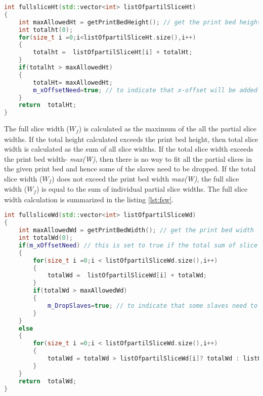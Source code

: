 \begin{lstlisting}[language=C++,label={lst:fsh},caption={Calculate full slice height}]
int fullsliceHt(std::vector<int> listOfpartilSliceHt)
{
	int maxAllowedHt = getPrintBedHeight(); // get the print bed height
	int totalht(0);
	for(size_t i =0;i<listOfpartilSliceHt.size(),i++)
	{
		totalht =  listOfpartilSliceHt[i] + totalHt;
	}
	if(totalht > maxAllowedHt)
	{
		totalHt= maxAllowedHt; 
		m_xOffsetNeed=true; // to indicate that x-offset will be added to some slaves
	}
	return 	totalHt;
}

\end{lstlisting}

The full slice width (\begin{math}W_{\textit{f}}\end{math}) is calculated as the maximum of the all the partial slice widths. If the total height calculated exceeds the print bed height, then total slice width is calculated as the sum of all slice widths. If the total slice width exceeds the print bed width- \textit{max(W)}, then there is no way to fit all the partial slices in the given print bed and hence some of the slaves need to be dropped. If the total slice width (\begin{math}W_{\textit{f}}\end{math}) does not exceed the print bed width \textit{max(W)}, the full slice width (\begin{math}W_{\textit{f}}\end{math}) is equal to the sum of individual partial slice widths. The full slice width calculation is summarized in the listing \ref{lst:fsw}.\newline     


\begin{lstlisting}[language=C++,label={lst:fsw},caption={Calculate full slice width}]
int fullsliceWd(std::vector<int> listOfpartilSliceWd)
{
	int maxAllowedWd = getPrintBedWidth(); // get the print bed width
	int totalWd(0);
	if(m_xOffsetNeed) // this is set to true if the total sum of slice heights > print bed height.
	{
		for(size_t i =0;i < listOfpartilSliceWd.size(),i++)
		{
			totalWd =  listOfpartilSliceWd[i] + totalWd;
		}
		if(totalWd > maxAllowedWd)
		{
			m_DropSlaves=true; // to indicate that some slaves need to be dropped
		}
	}
	else
	{
		for(size_t i =0;i < listOfpartilSliceWd.size(),i++)
		{
			totalWd = totalWd > listOfpartilSliceWd[i]? totalWd : listOfpartilSliceWd[i];
		}
	}
	return 	totalWd;
}
\end{lstlisting}

